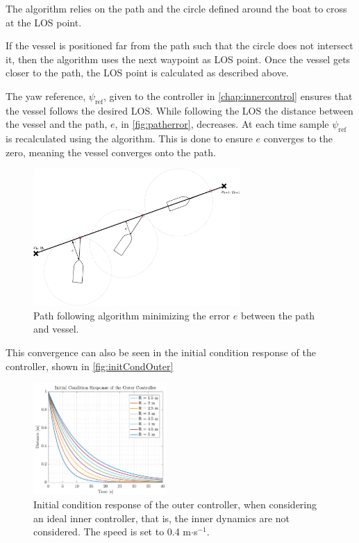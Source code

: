 The algorithm relies on the path and the circle defined around the boat to cross at the LOS point. 

If the vessel is positioned far from the path such that the circle does not intersect it, then the algorithm uses the next waypoint as LOS point. Once the vessel gets closer to the path, the LOS point is calculated as described above.

The yaw reference, $\psi_\mathrm{ref}$, given to the controller in \autoref{chap:innercontrol} ensures that the vessel follows the desired LOS. While following the LOS the distance between the vessel and the path, $e$, in \autoref{fig:patherror}, decreases. At each time sample $\psi_\mathrm{ref}$ is recalculated using the algorithm. This is done to ensure $e$ converges to the zero, meaning the vessel converges onto the path.
%
\begin{figure}[H]
	\includegraphics[width=0.7\textwidth]{figures/patherror}
	\caption{Path following algorithm minimizing the error $e$ between the path and vessel.}
	\label{fig:patherror}
\end{figure}
%

This convergence can also be seen in the initial condition response of the controller, shown in \autoref{fig:initCondOuter}
%
\begin{figure}[H]
    \includegraphics[width=0.45\textwidth]{figures/initCondOuter}
    \caption{Initial condition response of the outer controller, when considering an ideal inner controller, that is, the inner dynamics are not considered. The speed is set to \num{0.4} m$\cdot$s$^{-1}$.}
    \label{fig:initCondOuter}
\end{figure}


